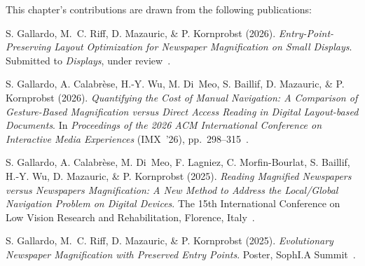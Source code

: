 This chapter's contributions are drawn from the following publications:

\begin{callout}
S. Gallardo, M.~C. Riff, D. Mazauric, \& P. Kornprobst (2026). \emph{Entry-Point-Preserving Layout Optimization for Newspaper Magnification on Small Displays}. Submitted to \emph{Displays}, under review~.

S. Gallardo, A. Calabr\`ese, H.-Y. Wu, M. Di~Meo, S. Baillif, D. Mazauric, \& P. Kornprobst (2026). \emph{Quantifying the Cost of Manual Navigation: A Comparison of Gesture-Based Magnification versus Direct Access Reading in Digital Layout-based Documents}. In \emph{Proceedings of the 2026 ACM International Conference on Interactive Media Experiences} (IMX~'26), pp.~298--315~. 

S. Gallardo, A. Calabr\`ese, M. Di~Meo, F. Lagniez, C. Morfin-Bourlat, S. Baillif, H.-Y. Wu, D. Mazauric, \& P. Kornprobst (2025). \emph{Reading Magnified Newspapers versus Newspapers Magnification: A New Method to Address the Local/Global Navigation Problem on Digital Devices}. The 15th International Conference on Low Vision Research and Rehabilitation, Florence, Italy~.

S. Gallardo, M.~C. Riff, D. Mazauric, \& P. Kornprobst (2025). \emph{Evolutionary Newspaper Magnification with Preserved Entry Points}. Poster, SophI.A Summit~.
\end{callout}